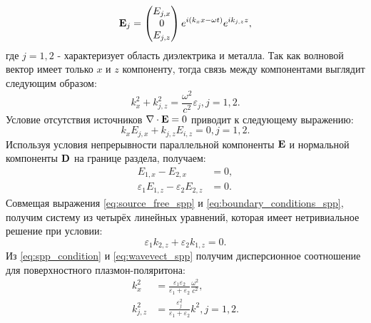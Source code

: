 \begin{equation}
    \vb{E}_j = \begin{pmatrix}
        E_{j,x} \\
        0 \\
        E_{j,z}
    \end{pmatrix} e^{i(k_x x - \omega t)} e^{i k_{j,z} z},
\end{equation}
где $j=1,2$ - характеризует область диэлектрика и металла. Так как волновой вектор имеет только $x$ и $z$ компоненту, тогда связь между компонентами выглядит следующим образом: 
\begin{equation}
    k_x^2 + k_{j,z}^2 = \frac{\omega^2}{c^2} \varepsilon_j, j=1,2. \label{eq:wavevect_spp}
\end{equation}
Условие отсутствия источников $\nabla \cdot \vb{E} = 0$ приводит к следующему выражению:
\begin{equation}
    k_x E_{j,x} + k_{j,z} E_{i,z} = 0, j=1,2. \label{eq:source_free_spp}
\end{equation}
Используя условия непрерывности параллельной компоненты $\vb{E}$ и нормальной компоненты $\vb{D}$ на границе раздела, получаем:
\begin{equation}
    \begin{aligned}
    E_{1,x} - E_{2,x} &= 0,\\
    \varepsilon_1 E_{1,z} - \varepsilon_2 E_{2,z} &= 0. \label{eq:boundary_conditions_spp}
    \end{aligned}
\end{equation}
Совмещая выражения \eqref{eq:source_free_spp} и \eqref{eq:boundary_conditions_spp}, получим систему из четырёх линейных уравнений, которая имеет нетривиальное решение при условии:
\begin{equation}
    \varepsilon_1 k_{2,z} + \varepsilon_2 k_{1,z} = 0. \label{eq:spp_condition}
\end{equation}
Из \eqref{eq:spp_condition} и \eqref{eq:wavevect_spp} получим дисперсионное соотношение для поверхностного плазмон-поляритона:
\begin{equation}
    \begin{aligned}
        k_x^2 &= \frac{\varepsilon_1 \varepsilon_2}{\varepsilon_1 + \varepsilon_2} \frac{\omega^2}{c^2}, \label{eq:spp_dispersion} \\
        k_{j,z}^2 &= \frac{\varepsilon_j^2}{\varepsilon_1+\varepsilon_2} k^2, j=1,2.
    \end{aligned}
\end{equation}

